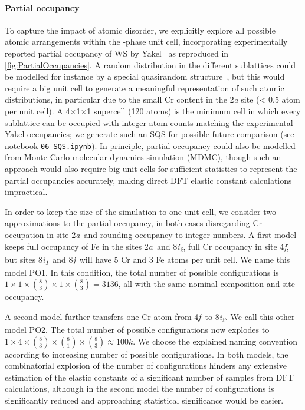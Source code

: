\documentclass[superscriptaddress, 12pt]{revtex4-2}%
\newcommand{\siteA}{2\textit{a}}
\newcommand{\siteB}{4\textit{f}}
\newcommand{\siteC}{8\textit{i\textsubscript{1}}}
\newcommand{\siteD}{8\textit{i\textsubscript{2}}}
\newcommand{\siteE}{8\textit{j}}
\begin{document}
\paragraph{Partial occupancy}\label{methodology:po} To capture the impact of atomic disorder, we explicitly explore all possible atomic arrangements within the \textsigma-phase unit cell, incorporating experimentally reported partial occupancy of WS by Yakel~\cite{yakel_atom_1983} as reproduced in \autoref{fig:PartialOccupancies}.  
A random distribution in the different sublattices could be modelled for instance by a special quasirandom structure~\cite{zunger_sqs_1990}, but this would require a big unit cell to generate a meaningful representation of such atomic distributions, in particular due to the small Cr content in the 2\textit{a} site (< 0.5 atom per unit cell).
A 4$\times$1$\times$1 supercell (120 atoms) is the minimum cell in which every sublattice can be occupied with integer atom counts matching the experimental Yakel occupancies; we generate such an SQS for possible future comparison (see notebook \texttt{06-SQS.ipynb}).
In principle, partial occupancy could also be modelled from Monte Carlo molecular dynamics simulation (MDMC), though such an approach would also require big unit cells for sufficient statistics to represent the partial occupancies accurately, making direct DFT elastic constant calculations impractical.


In order to keep the size of the simulation to one unit cell, we consider two approximations to the partial occupancy, in both cases disregarding Cr occupation in site \siteA~and rounding occupancy to integer numbers.  
A first model keeps full occupancy of Fe in the sites \siteA~and \siteD, full Cr occupancy in site \siteB, but sites \siteC~and \siteE~will have 5 Cr and 3 Fe atoms per unit cell.
We name this model PO1. 
In this condition, the total number of possible configurations is $1 \times 1 \times \binom{8}{3} \times 1 \times \binom{8}{3} = 3136 $, all with the same nominal composition and site occupancy.

A second model further transfers one Cr atom from \siteB~to \siteD.
We call this other model PO2.
The total number of possible configurations now explodes to $ 1 \times 4 \times \binom{8}{3}\times \binom{8}{1} \times \binom{8}{3} \approx 100k $.
We choose the explained naming convention according to increasing number of possible configurations.
In both models, the combinatorial explosion of the number of configurations hinders any extensive estimation of the elastic constants of a significant number of samples from DFT calculations, although in the second model the number of configurations is significantly reduced and approaching statistical significance would be easier.
\end{document}
